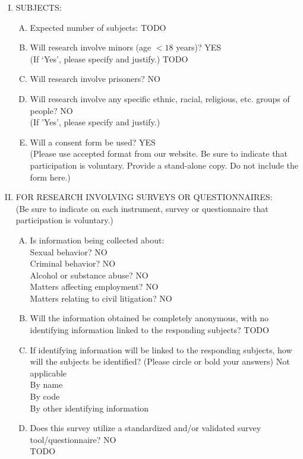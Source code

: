 \documentclass{article}
\newcommand{\response}[1]{{\color{blue}#1}}
\newcommand{\yes}{{\color{blue}YES}\\ }
\newcommand{\no}{{\color{blue}NO}\\ }
\newcommand{\na}{{\color{blue}Not applicable} }
\begin{document}
\begin{enumerate}[I.]
    \item SUBJECTS:
        \begin{enumerate}[A.]
            \item Expected number of subjects: \response{TODO}
            \item Will research involve minors (age $<18$ years)?  \yes
                        (If `Yes', please specify and justify.)
                        \response{TODO}
            \item Will research involve prisoners? \no
            \item Will research involve any specific ethnic, racial,
                religious, etc.  groups of people? \no
                (If 'Yes', please specify and justify.)
            \item Will a consent form be used?  \yes
                (Please use accepted format
                from our website. Be sure to indicate that participation is
                voluntary. Provide a stand-alone copy. Do not include the form
                here.)
        \end{enumerate}

    \item FOR RESEARCH INVOLVING SURVEYS OR QUESTIONNAIRES:\\
            (Be sure to indicate on each instrument, survey or questionnaire
            that participation is voluntary.)
        \begin{enumerate}[A.]
                \item Is information being collected about:\\
                    Sexual behavior? \no
                    Criminal behavior? \no
                    Alcohol or substance abuse? \no
                    Matters affecting employment? \no
                    Matters relating to civil litigation? \no
                \item Will the information obtained be completely anonymous,
                    with no identifying information linked to the responding
                    subjects? TODO
                \item If identifying information will be linked to the
                    responding subjects, how will the subjects be identified?
                    (Please circle or bold your answers) \na \\
                    By name\\
                    By code\\
                    By other identifying information
                \item Does this survey utilize a standardized and/or
                    validated survey tool/questionnaire? \no TODO
        \end{enumerate}


\end{enumerate}
\end{document}
